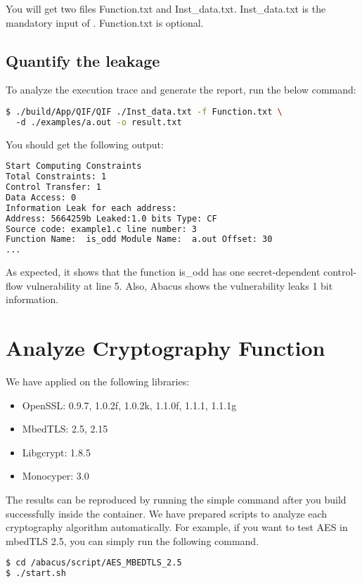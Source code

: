You will get two files \textsf{Function.txt} and \textsf{Inst\_data.txt}. \textsf{Inst\_data.txt} is the mandatory input of \tool{}. \textsf{Function.txt} is optional. 

\subsection*{Quantify the leakage}
To analyze the execution trace and generate the report, run the below command:
\begin{lstlisting}[language=bash]
$ ./build/App/QIF/QIF ./Inst_data.txt -f Function.txt \ 
  -d ./examples/a.out -o result.txt
\end{lstlisting}

You should get the following output:

\begin{lstlisting}[language=bash]
Start Computing Constraints
Total Constraints: 1
Control Transfer: 1
Data Access: 0
Information Leak for each address:
Address: 5664259b Leaked:1.0 bits Type: CF  
Source code: example1.c line number: 3
Function Name:  is_odd Module Name:  a.out Offset: 30
...
\end{lstlisting}

As expected, it shows that the function \textsf{is\_odd} has one secret-dependent control-flow vulnerability at line 5. Also, Abacus shows the vulnerability leaks 1 bit information.

\section*{Analyze Cryptography Function}
We have applied \tool{} on the following libraries:
\begin{itemize}
\item OpenSSL: 0.9.7, 1.0.2f, 1.0.2k, 1.1.0f, 1.1.1, 1.1.1g
\item MbedTLS: 2.5, 2.15
\item Libgcrypt: 1.8.5
\item Monocyper: 3.0
\end{itemize}

The results can be reproduced by running the simple command after you build \tool{} successfully inside the container. We have prepared scripts to analyze each cryptography algorithm automatically.
For example, if you want to test AES in mbedTLS 2.5, you can simply run the 
following command.

\begin{lstlisting}[language=bash]
$ cd /abacus/script/AES_MBEDTLS_2.5
$ ./start.sh
\end{lstlisting}

